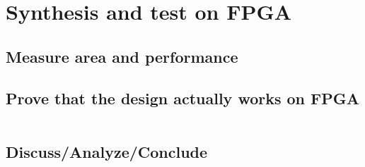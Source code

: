 \section{Synthesis and test on FPGA}
\subsection{Measure area and performance}
%
\subsection{Prove that the design actually works on FPGA}
\inputminted[linenos=0]{text}{../rocket.txt}
%
\subsection{Discuss/Analyze/Conclude}